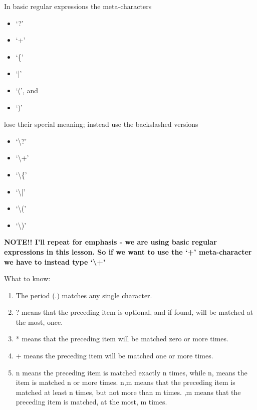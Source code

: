 \documentclass[10pt]{article}
\begin{document}
In basic regular expressions the meta-characters
\begin{itemize}
\item `?'
\item `+'
\item `\{'
\item `|'
\item `(', and
\item `)'
\end{itemize}

 lose their special meaning; instead use the backslashed versions

\begin{itemize}
\item `\textbackslash?'
\item `\textbackslash+'
\item `\textbackslash\{'
\item `\textbackslash|'
\item `\textbackslash('
\item `\textbackslash)'
\end{itemize}

{\LARGE\textbf{NOTE!! I'll repeat for emphasis - we are using basic regular
expressions in this lesson. So if we want to use the `+' meta-character we have
to instead type `\textbackslash+'}}

What to know:
\begin{enumerate}
\item The period (.) matches any single character.
\item ? means that the preceding item is optional, and if found, will be matched at the most, once.
\item * means that the preceding item will be matched zero or more times.
\item + means the preceding item will be matched one or more times.
\item {n} means the preceding item is matched exactly n times, while {n,} means the item is matched n or more times. {n,m} means that the preceding item is matched at least n times, but not more than m times. {,m} means that the preceding item is matched, at the most, m times.
\end{enumerate}
\end{document}
